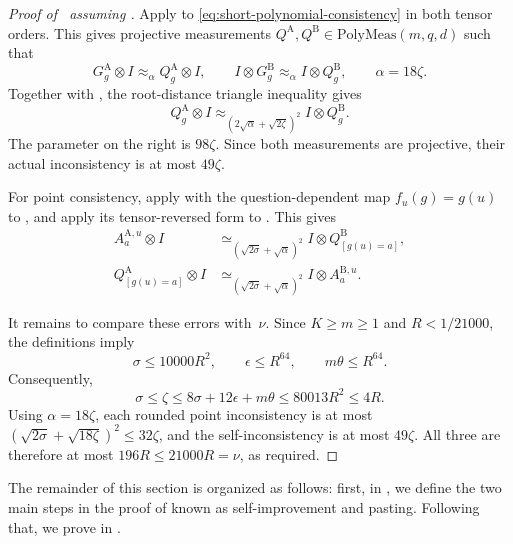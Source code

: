 \documentclass[11pt]{article}
\theoremstyle{definition}
\newcommand{\eps}{\epsilon}
\newcommand{\polymeas}[3]{\mathrm{PolyMeas}(#1, #2, #3)}
\begin{document}
\begin{proof}[Proof of~ assuming ]
Apply  to
\eqref{eq:short-polynomial-consistency} in both tensor orders.  This
gives projective measurements
\(Q^{\mathrm A},Q^{\mathrm B}\in\polymeas{m}{q}{d}\) such that
\begin{equation}\label{eq:short-rounding-error}
 G^{\mathrm A}_g\otimes I\approx_\alpha Q^{\mathrm A}_g\otimes I,
 \qquad
 I\otimes G^{\mathrm B}_g\approx_\alpha I\otimes Q^{\mathrm B}_g,
 \qquad
 \alpha=18\zeta.
\end{equation}
Together with , the root-distance triangle
inequality gives
\[
 Q^{\mathrm A}_g\otimes I
 \approx_{(2\sqrt\alpha+\sqrt{2\zeta})^2}
 I\otimes Q^{\mathrm B}_g.
\]
The parameter on the right is \(98\zeta\).  Since both measurements
are projective, their actual inconsistency is at most \(49\zeta\).

For point consistency, apply
 with the
question-dependent map \(f_u(g)=g(u)\) to
, and apply its
tensor-reversed form to
.  This gives
\begin{align}
 A^{\mathrm A,u}_a\otimes I
 &\simeq_{(\sqrt{2\sigma}+\sqrt\alpha)^2}
 I\otimes Q^{\mathrm B}_{[g(u)=a]},\label{eq:short-rounded-point-a}\\
 Q^{\mathrm A}_{[g(u)=a]}\otimes I
 &\simeq_{(\sqrt{2\sigma}+\sqrt\alpha)^2}
 I\otimes A^{\mathrm B,u}_a.\label{eq:short-rounded-point-b}
\end{align}

It remains to compare these errors with~$\nu$.  Since $K\geq m\geq1$
and $R<1/21000$, the definitions imply
\begin{equation}\label{eq:short-sigma-bound}
 \sigma\leq10000R^2,\qquad
 \eps\leq R^{64},\qquad m\theta\leq R^{64}.
\end{equation}
Consequently,
\[
 \sigma\leq\zeta\leq8\sigma+12\eps+m\theta
 \leq80013R^2\leq4R.
\]
Using $\alpha=18\zeta$, each rounded point inconsistency is at most
$(\sqrt{2\sigma}+\sqrt{18\zeta})^2\leq32\zeta$, and the
self-inconsistency is at most $49\zeta$.  All three are therefore
at most $196R\leq21000R=\nu$, as required.
\end{proof}

The remainder of this section is organized as follows:
first, in , we define the two main steps in the proof of 
known as self-improvement and pasting.
Following that, we prove  in .
\end{document}
